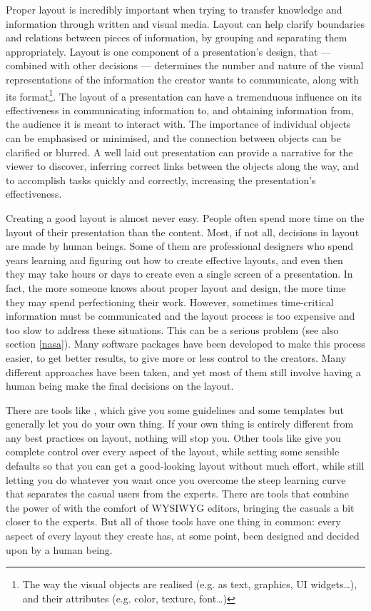   Proper layout is incredibly important when trying to transfer knowledge and
   information through written and visual media. Layout can help clarify
   boundaries and relations between pieces of information, by grouping and
   separating them appropriately. Layout is one component of a presentation's
   design, that --- combined with other decisions --- determines the number and
   nature of the visual representations of the information the creator wants to
   communicate, along with its format\footnote{The way the visual objects are
   realised (e.g. as text, graphics, UI widgets\ldots), and their attributes
   (e.g. color, texture, font\ldots)}. The layout of a presentation can have a
   tremenduous influence on its effectiveness in communicating information to,
   and obtaining information from, the audience it is meant to interact with.
   The importance of individual objects can be emphasised or minimised, and the
   connection between objects can be clarified or blurred. A well laid out
   presentation can provide a narrative for the viewer to discover, inferring
   correct links between the objects along the way, and to accomplish tasks
   quickly and correctly, increasing the presentation's effectiveness.

   Creating a good layout is almost never easy. People often spend more time on
   the layout of their presentation than the content. Most, if not all,
   decisions in layout are made by human beings. Some of them are professional
   designers who spend years learning and figuring out how to create effective
   layouts, and even then they may take hours or days to create even a single
   screen of a presentation. In fact, the more someone knows about proper
   layout and design, the more time they may spend perfectioning their work.
   However, sometimes time-critical information must be communicated and the
   layout process is too expensive and too slow to address these situations.
   This can be a serious problem (see also section \ref{nasa}). Many software
   packages have been developed to make this process easier, to get better
   results, to give more or less control to the creators. Many different
   approaches have been taken, and yet most of them still involve having a
   human being make the final decisions on the layout.

   There are tools like \ppt, which give you some guidelines and some templates
   but generally let you do your own thing. If your own thing is entirely
   different from any best practices on layout, nothing will stop you. Other
   tools like \latex give you complete control over every aspect of the layout,
   while setting some sensible defaults so that you can get a good-looking
   layout without much effort, while still letting you do whatever you want
   once you overcome the steep learning curve that separates the casual users
   from the experts. There are tools that combine the power of \latex with the
   comfort of WYSIWYG editors, bringing the casuals a bit closer to the
   experts. But all of those tools have one thing in common: every aspect of
   every layout they create has, at some point, been designed and decided upon
   by a human being.


